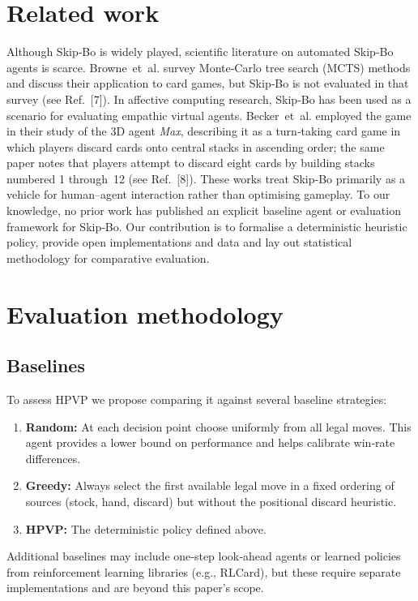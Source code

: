 \documentclass[11pt]{article}
\begin{document}
\section{Related work}
Although Skip‑Bo is widely played, scientific literature on automated Skip‑Bo agents is scarce. Browne et al. survey Monte‑Carlo tree search (MCTS) methods and discuss their application to card games, but Skip‑Bo is not evaluated in that survey (see Ref.~[7]). In affective computing research, Skip‑Bo has been used as a scenario for evaluating empathic virtual agents. Becker et al. employed the game in their study of the 3D agent \emph{Max}, describing it as a turn‑taking card game in which players discard cards onto central stacks in ascending order; the same paper notes that players attempt to discard eight cards by building stacks numbered 1 through 12 (see Ref.~[8]). These works treat Skip‑Bo primarily as a vehicle for human–agent interaction rather than optimising gameplay. To our knowledge, no prior work has published an explicit baseline agent or evaluation framework for Skip‑Bo. Our contribution is to formalise a deterministic heuristic policy, provide open implementations and data and lay out statistical methodology for comparative evaluation.

\section{Evaluation methodology}
\subsection{Baselines}
To assess HPVP we propose comparing it against several baseline strategies:
\begin{enumerate}
\item \textbf{Random:} At each decision point choose uniformly from all legal moves. This agent provides a lower bound on performance and helps calibrate win‑rate differences.
\item \textbf{Greedy:} Always select the first available legal move in a fixed ordering of sources (stock, hand, discard) but without the positional discard heuristic.
\item \textbf{HPVP:} The deterministic policy defined above.
\end{enumerate}
Additional baselines may include one‑step look‑ahead agents or learned policies from reinforcement learning libraries (e.g., RLCard), but these require separate implementations and are beyond this paper’s scope.
\end{document}

